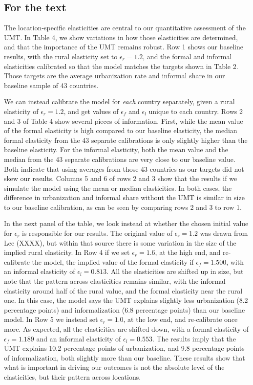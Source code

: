 \documentclass[10pt]{article}
\begin{document}
\onehalfspacing 

\subsection{For the text}
The location-specific elasticities are central to our quantitative assessment of the UMT. In Table 4, we show variations in how those elasticities are determined, and that the importance of the UMT remains robust. Row 1 shows our baseline results, with the rural elasticity set to $\epsilon_r = 1.2$, and the formal and informal elasticities calibrated so that the model matches the targets shown in Table 2. Those targets are the average urbanization rate and informal share in our baseline sample of 43 countries.

We can instead calibrate the model for \textit{each} country separately, given a rural elasticity of $\epsilon_r = 1.2$, and get values of $\epsilon_f$ and $\epsilon_l$ unique to each country. Rows 2 and 3 of Table 4 show several pieces of information. First, while the mean value of the formal elasticity is high compared to our baseline elasticity, the median formal elasticity from the 43 separate calibrations is only slightly higher than the baseline elasticity. For the informal elasticity, both the mean value and the median from the 43 separate calibrations are very close to our baseline value. Both indicate that using averages from those 43 countries as our targets did not skew our results. Columns 5 and 6 of rows 2 and 3 show that the results if we simulate the model using the mean or median elasticities. In both cases, the difference in urbanization and informal share without the UMT is similar in size to our baseline calibration, as can be seen by comparing rows 2 and 3 to row 1. 

In the next panel of the table, we look instead at whether the chosen initial value for $\epsilon_r$ is responsible for our results. The original value of $\epsilon_r = 1.2$ was drawn from Lee (XXXX), but within that source there is some variation in the size of the implied rural elasticity. In Row 4 if we set $\epsilon_r = 1.6$, at the high end, and re-calibrate the model, the implied value of the formal elasticity if $\epsilon_f = 1.500$, with an informal elasticity of $\epsilon_l = 0.813$. All the elasticities are shifted up in size, but note that the pattern across elasticities remains similar, with the informal elasticity around half of the rural value, and the formal elasticity near the rural one. In this case, the model says the UMT explains slightly less urbanization (8.2 percentage points) and informalization (6.8 percentage points) than our baseline model. In Row 5 we instead set $\epsilon_r = 1.0$, at the low end, and re-calibrate once more. As expected, all the elasticities are shifted down, with a formal elasticity of $\epsilon_f = 1.189$ and an informal elasticity of $\epsilon_l = 0.553$. The results imply that the UMT explains 10.2 percentage points of urbanization, and 9.8 percentage points of informalization, both slightly more than our baseline. These results show that what is important in driving our outcomes is not the absolute level of the elasticities, but their pattern across locations. 
\end{document}
